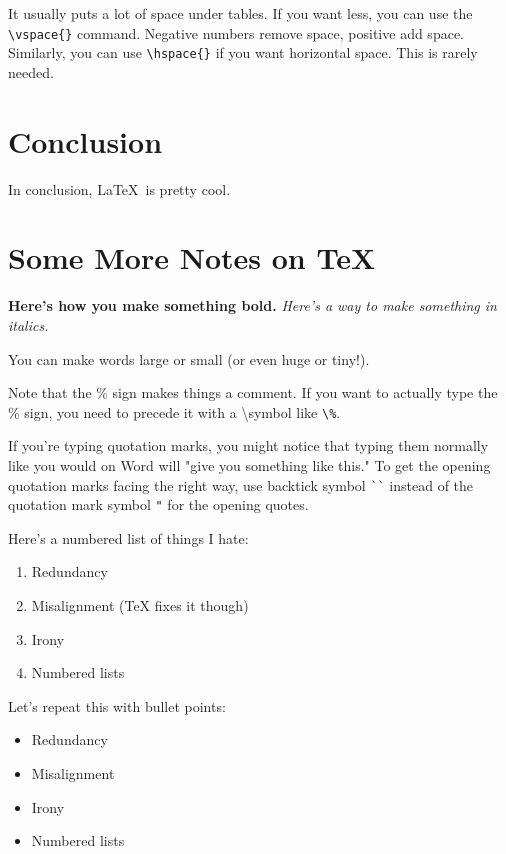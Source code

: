 \documentclass[12pt]{article}
\begin{document}
\vspace{-0.5cm}
It usually puts a lot of space under tables. If you want less, you can use the \verb!\vspace{}! command. Negative numbers remove space, positive add space. Similarly, you can use \verb!\hspace{}! if you want horizontal space. This is rarely needed.


\section{Conclusion}

In conclusion, \LaTeX ~is pretty cool.

\appendix

\section{Some More Notes on TeX}

{\bf Here's how you make something bold.} \emph{Here's a way to make something in italics.}

You can make words {\large large} {\small or small} (or even {\huge huge} or {\tiny tiny}!).

Note that the \% sign makes things a comment. If you want to actually type the \% sign, you need to precede it with a
\textbackslash symbol like \verb!\%!.

If you're typing quotation marks, you might notice that typing them normally like you would on Word will "give you something like this." To get the opening quotation marks facing the right way, use backtick symbol \verb!``! instead of the quotation mark symbol \verb!"! for the opening quotes.

Here's a numbered list of things I hate:
\begin{enumerate}
\item Redundancy
		\item Misalignment (TeX fixes it though)
\item Irony
\item Numbered lists
\end{enumerate}
Let's repeat this with bullet points:
\begin{itemize}
\item Redundancy
		\item Misalignment 
\item Irony
\item Numbered lists
\end{itemize}
\end{document}
